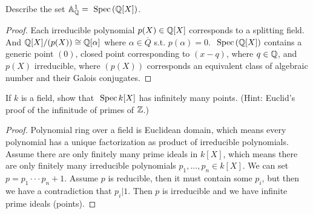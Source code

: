 \begin{exr}
Describe the set $\mathbb A^1_\mathbb Q=\text{ Spec\,}(\mathbb Q[X])$.
\end{exr}
\begin{proof}
Each irreducible polynomial $p(X)\in\mathbb Q[X]$ corresponds to a splitting field. And $\mathbb Q[X]/(p(X))\cong \mathbb Q[\alpha]$ where $\alpha\in\overline{Q}$ s.t. $p(\alpha)=0$. $\text{ Spec\,}(\mathbb Q[X])$ contains a generic point $(0)$, closed point corresponding to $(x-q)$, where $q\in\mathbb Q$, and $p(X)$ irreducible, where $(p(X))$ corresponds an equivalent class of algebraic number and their Galois conjugates. 
\end{proof}

\begin{exr}
If $k$ is a field, show that $\text{ Spec\,} k[X]$ has infinitely many points. (Hint: Euclid’s proof of the infinitude of primes of $\mathbb Z$.)
\end{exr}
\begin{proof}
Polynomial ring over a field is Euclidean domain, which means every polynomial has a unique factorization as product of irreducible polynomials. Assume there are only finitely many prime ideals in $k[X]$, which means there are only finitely many irreducible polynomials $p_1,...,p_n\in k[X]$. We can set $p=p_1\cdot\cdot\cdot p_n+1$. Assume $p$ is reducible, then it must contain some $p_i$, but then we have a contradiction that $p_i|1$. Then $p$ is irreducible and we have infinite prime ideals (points).
\end{proof}

